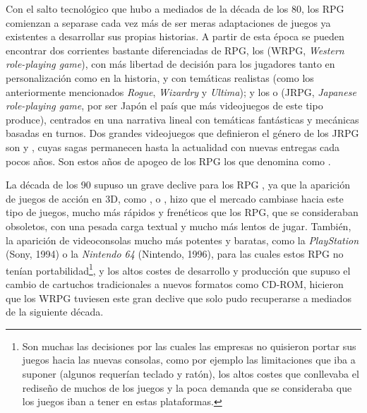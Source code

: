 \medskip

Con el salto tecnológico que hubo a mediados de la década de los 80, los RPG comienzan a separase cada vez más de ser meras adaptaciones de juegos ya existentes a desarrollar sus propias historias. A partir de esta época se pueden encontrar dos corrientes bastante diferenciadas de RPG, los  (WRPG, \textit{Western role-playing game}), con más libertad de decisión para los jugadores tanto en personalización como en la historia, y con temáticas realistas (como los anteriormente mencionados \textit{Rogue}, \textit{Wizardry} y \textit{Ultima}); y los  o  (JRPG, \textit{Japanese role-playing game}, por ser Japón el país que más videojuegos de este tipo produce), centrados en una narrativa lineal con temáticas fantásticas y mecánicas basadas en turnos. Dos grandes videojuegos que definieron el género de los JRPG son  y , cuyas sagas permanecen hasta la actualidad con nuevas entregas cada pocos años. Son estos años de apogeo de los RPG los que \citeauthor{barton2008dungeons} denomina como .

\medskip

La década de los 90 supuso un grave declive para los RPG , ya que la aparición de juegos de acción en 3D, como ,  o , hizo que el mercado cambiase hacia este tipo de juegos, mucho más rápidos y frenéticos que los RPG, que se consideraban obsoletos, con una pesada carga textual y mucho más lentos de jugar. También, la aparición de videoconsolas mucho más potentes y baratas, como la \textit{PlayStation} (Sony, 1994) o la \textit{Nintendo 64} (Nintendo, 1996), para las cuales estos RPG no tenían portabilidad\footnote{Son muchas las decisiones por las cuales las empresas  no quisieron portar sus juegos hacia las nuevas consolas, como por ejemplo las limitaciones que iba a suponer (algunos requerían teclado y ratón), los altos costes que conllevaba el rediseño de muchos de los juegos y la poca demanda que se consideraba que los juegos iban a tener en estas plataformas.}, y los altos costes de desarrollo y producción que supuso el cambio de cartuchos tradicionales a nuevos formatos como CD-ROM, hicieron que los WRPG tuviesen este gran declive que solo pudo recuperarse a mediados de la siguiente década.

\medskip

